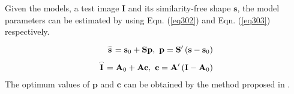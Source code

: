 \par Given the models, a test image {\bf I} and its similarity-free shape $\mathbf{s}$, the model parameters can be estimated by using Eqn. (\ref{eq302}) and Eqn. (\ref{eq303}) respectively.
\begin{align}
{\text{  }}{\mathbf{\overset{\lower0.5em\hbox{$\smash{\scriptscriptstyle\frown}$}}{s} }} = {{\mathbf{s}}_0} + {\mathbf{Sp}},{\text{   }}{\mathbf{p}} = {\mathbf{S'}}\left( {{\mathbf{s}} - {{\mathbf{s}}_0}} \right)\label{eq302} \\
{\mathbf{\overset{\lower0.5em\hbox{$\smash{\scriptscriptstyle\frown}$}}{I} }} = {{\mathbf{A}}_0} + {\mathbf{Ac}},{\text{  }}{\mathbf{c}} = {\mathbf{A'}}\left( {{\mathbf{I}} - {{\mathbf{A}}_0}} \right)\label{eq303}
\end{align}
The optimum values of $\mathbf{p}$ and $\mathbf{c}$ can be obtained by the method proposed in \cite {6751183}. 
